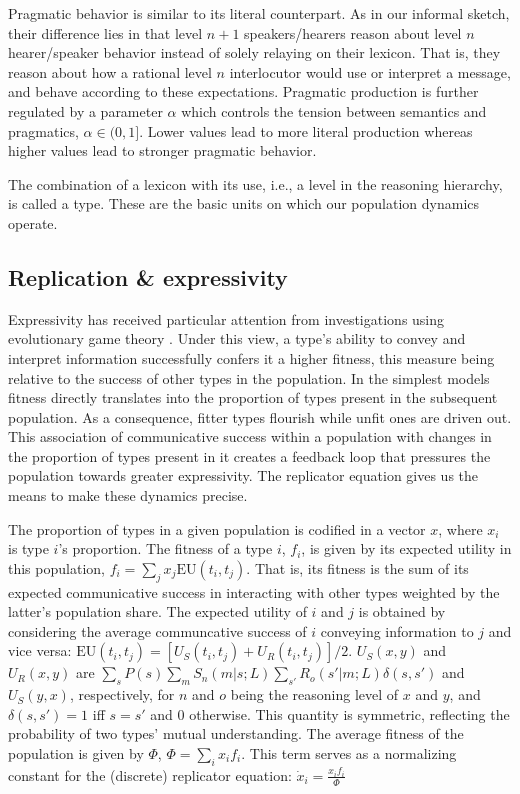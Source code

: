 \documentclass[a4paper]{article}
\begin{document}
Pragmatic behavior is similar to its literal counterpart. As in our informal sketch, their difference lies in that level $n+1$ speakers/hearers reason about level $n$ hearer/speaker behavior instead of solely relaying on their lexicon. That is, they reason about how a rational level $n$ interlocutor would use or interpret a message, and behave according to these expectations. Pragmatic production is further regulated by a parameter $\alpha$ which controls the tension between semantics and pragmatics, $\alpha \in (0,1]$. Lower values lead to more literal production whereas higher values lead to stronger pragmatic behavior. 

The combination of a lexicon with its use, i.e., a level in the reasoning hierarchy, is called a type. These are the basic units on which our population dynamics operate. 

\subsection{Replication \& expressivity}\label{sec:expressivity}
Expressivity has received particular attention from investigations using evolutionary game theory \citep{nowak+krakauer:1999,nowak+etal:2000, nowak+etal:2002}. Under this view, a type's ability to convey and interpret information successfully confers it a higher fitness, this measure being relative to the success of other types in the population. In the simplest models fitness directly translates into the proportion of types present in the subsequent population. As a consequence, fitter types flourish while unfit ones are driven out. This association of communicative success within a population with changes in the proportion of types present in it creates a feedback loop that pressures the population towards greater expressivity. The replicator equation gives us the means to make these dynamics precise.

The proportion of types in a given population is codified in a vector $x$, where $x_i$ is type $i$'s proportion. The fitness of a type $i$, $f_i$, is given by its expected utility in this population, $f_i = \sum_j x_j \text{EU}(t_i,t_j)$. That is, its fitness is the sum of its expected communicative success in interacting with other types weighted by the latter's population share. The expected utility of $i$ and $j$ is obtained by considering the average communcative success of $i$ conveying information to $j$ and vice versa: $\text{EU}(t_i,t_j) = [U_S(t_i,t_j) + U_R(t_i,t_j)]/2$. $U_S(x,y)$ and $U_R(x,y)$ are $\sum_s P(s)\sum_m S_n(m|s;L) \sum_{s'} R_o(s'|m;L) \delta(s,s')$ and $U_S(y,x)$, respectively, for $n$ and $o$ being the reasoning level of $x$ and $y$, and $\delta(s,s') = 1$ iff $s = s'$ and $0$ otherwise. This quantity is symmetric, reflecting the probability of two types' mutual understanding. The average fitness of the population is given by $\Phi$, $\Phi = \sum_i x_i f_i$. This term serves as a normalizing constant for the (discrete) replicator equation: $\dot{x}_i = \frac{x_i f_i}{\Phi}$ 
\end{document}
